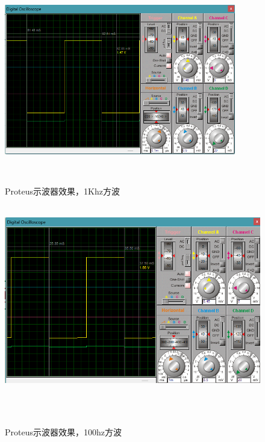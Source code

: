 \documentclass[12pt,hyperref,a4paper,UTF8]{ctexart}
\begin{document}
\begin{figure}[H] %
    \centering
    \includegraphics[width=0.9\textwidth]{figures/201.png} %
    \caption{Proteus示波器效果，1Khz方波 } %
    \label{fig:example} %
\end{figure}


\begin{figure}[H] %
    \centering
    \includegraphics[width=1\textwidth]{figures/202.png} %
    \caption{Proteus示波器效果，100hz方波 } %
    \label{fig:example} %
\end{figure}
\end{document}
